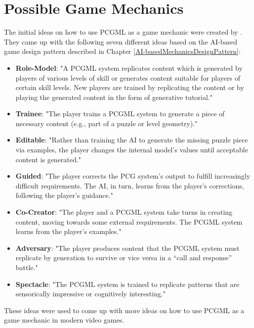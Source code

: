 \documentclass[MGS,Master,english]{twbook}%
\begin{document}
\chapter{Possible Game Mechanics} \label{chapter::possibleGameMechanics}
The initial ideas on how to use \ac{PCGML} as a game mechanic were created by \citep{pcgml::paper}. They came up with the following seven different ideas based on the \ac{AI}-based game design pattern described in Chapter \ref{AI-basedMechanicsDesignPattern}:
\begin{itemize}
	\item \textbf{Role-Model}: "A \ac{PCGML} system replicates content which is generated by players of various levels of skill or generates content suitable for players of certain skill levels. New players are trained by replicating the content or by playing the generated content in the form of generative tutorial." \cite[p. 13]{pcgml::paper}
	\item \textbf{Trainee}: "The player trains a \ac{PCGML} system to generate a piece of necessary content (e.g., part of a puzzle or level geometry)." \cite[p. 13]{pcgml::paper}
	\item \textbf{Editable}: "Rather than training the \ac{AI} to generate the missing puzzle piece via examples, the player changes the internal model’s values until acceptable content is generated." \cite[p. 13]{pcgml::paper}
	\item \textbf{Guided}: "The player corrects the \ac{PCG} system’s output to fulfill increasingly difficult requirements. The \ac{AI}, in turn, learns from the player’s corrections, following the player’s guidance." \cite[p. 13]{pcgml::paper}
	\item \textbf{Co-Creator}: "The player and a \ac{PCGML} system take turns in creating content, moving towards some external requirements. The \ac{PCGML} system learns from the player’s examples." \cite[p. 13]{pcgml::paper}
	\item \textbf{Adversary}: "The player produces content that the \ac{PCGML} system must replicate by generation to survive or vice versa in a “call and response” battle." \cite[p. 13]{pcgml::paper}
	\item \textbf{Spectacle}: "The \ac{PCGML} system is trained to replicate patterns that are sensorically impressive or cognitively interesting." \cite[p. 13]{pcgml::paper}
\end{itemize}
These ideas were used to come up with more ideas on how to use \ac{PCGML} as a game mechanic in modern video games.
\end{document}
